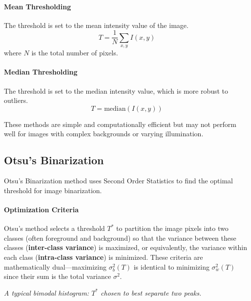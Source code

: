 \paragraph{Mean Thresholding} The threshold is set to the mean intensity value of the image.
   \[
   T = \frac{1}{N} \sum_{x,y} I(x,y)
   \]
   where \(N\) is the total number of pixels.

\paragraph{Median Thresholding} The threshold is set to the median intensity value, which is more robust to outliers.
   \[
   T = \text{median}(I(x,y))
   \]

These methods are simple and computationally efficient but may not perform well for images with complex backgrounds or varying illumination.

\subsection{Otsu’s Binarization}

Otsu's Binarization method uses Second Order Statistics to find the optimal threshold for image binarization.


\paragraph{Optimization Criteria}

Otsu’s method selects a threshold $T^*$ to partition the image pixels into two classes (often foreground and background) so that the variance between these classes (\textbf{inter-class variance}) is maximized, or equivalently, the variance within each class (\textbf{intra-class variance}) is minimized. These criteria are mathematically dual—maximizing $\sigma_b^2(T)$ is identical to minimizing $\sigma_w^2(T)$ since their sum is the total variance $\sigma^2$.

\begin{center}

\textit{A typical bimodal histogram: $T^*$ chosen to best separate two peaks.}
\end{center}

